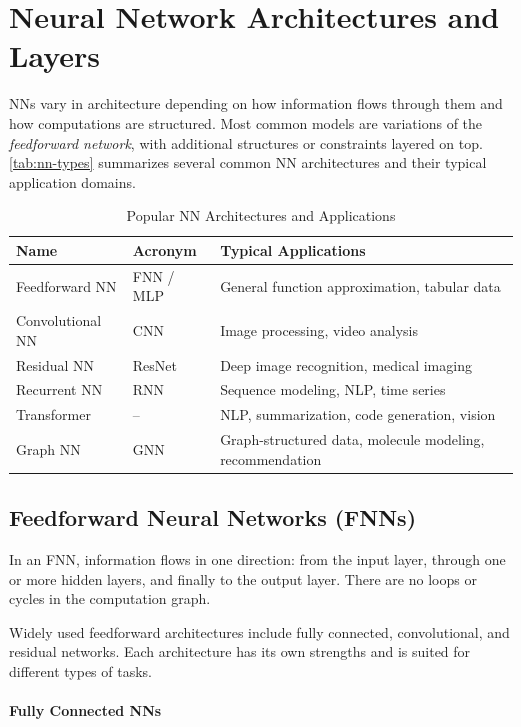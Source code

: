 \documentclass[oneside,11pt,dvipsnames]{book}
\numberwithin{equation}{section}
\theoremstyle{definition}
\theoremstyle{remark}
\begin{document}
\section{Neural Network Architectures and Layers}

NNs vary in architecture depending on how information flows through them and how computations are structured. Most common models are variations of the \emph{feedforward network}, with additional structures or constraints layered on top.  \autoref{tab:nn-types} summarizes several common NN architectures and their typical application domains.

\begin{table}[ht]
\caption{Popular NN Architectures and Applications}\label{tab:nn-types}
\centering
\small
\begin{tabular}{llp{8cm}@{}}
\toprule
\textbf{Name} & \textbf{Acronym} & \textbf{Typical Applications} \\
\midrule
Feedforward NN & FNN / MLP & General function approximation, tabular data \\
Convolutional NN & CNN & Image processing, video analysis \\
Residual NN & ResNet & Deep image recognition, medical imaging \\
Recurrent NN & RNN & Sequence modeling, NLP, time series \\
Transformer & -- & NLP, summarization, code generation, vision \\
Graph NN & GNN & Graph-structured data, molecule modeling, recommendation \\
\bottomrule
\end{tabular}
\end{table}




\subsection{Feedforward Neural Networks (FNNs)}\label{sec:ffn}

In an FNN, information flows in one direction: from the input layer, through one or more hidden layers, and finally to the output layer. There are no loops or cycles in the computation graph. 

Widely used feedforward architectures include fully connected, convolutional, and residual networks. Each architecture has its own strengths and is suited for different types of tasks.

\paragraph{Fully Connected NNs}
\end{document}
